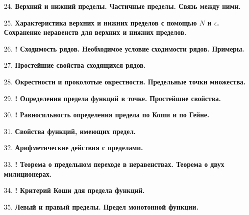 \documentclass[12pt]{article}
\begin{document}
24. \textbf{Верхний и нижний пределы. Частичные пределы. Связь между ними.}

25. \textbf{Характеристика верхних и нижних пределов с помощью $N$ и $\epsilon$. Сохранение неравенств для верхних и нижних пределов.}

26. \textbf{! Сходимость рядов. Необходимое условие сходимости рядов. Примеры.}

27. \textbf{Простейшие свойства сходящихся рядов.}

28. \textbf{Окрестности и проколотые окрестности. Предельные точки множества.}

29. \textbf{! Определения предела функций в точке. Простейшие свойства.}

30. \textbf{! Равносильность определения предела по Коши и по Гейне.}

31. \textbf{Свойства функций, имеющих предел.}

32. \textbf{Арифметические действия с пределами.}

33. \textbf{! Теорема о предельном переходе в неравенствах. Теорема о двух милиционерах.}

34. \textbf{! Критерий Коши для предела функций.}

35. \textbf{Левый и правый пределы. Предел монотонной функции.}
\end{document}
